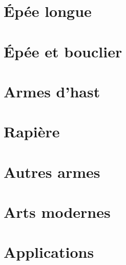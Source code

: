 \documentclass[10pt, a4paper, oneside, titlepage]{book}
\begin{document}


% 


\part{Épée longue}






\part{Épée et bouclier}





% 


\part{Armes d'hast}





% 
% 


\part{Rapière}





\part{Autres armes}




\part{Arts modernes}


% 


\part{Applications}
\label{part:applications}



% 
\end{document}
